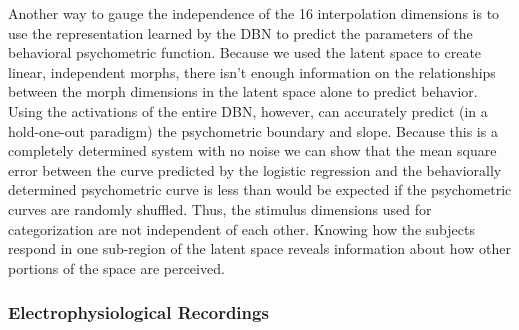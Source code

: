 Another way to gauge the independence of the 16 interpolation dimensions is to use the representation learned by the DBN to predict the parameters of the behavioral psychometric function. Because we used the latent space to create linear, independent morphs, there isn't enough information on the relationships between the morph dimensions in the latent space alone to predict behavior. Using the activations of the entire DBN, however, can accurately predict (in a hold-one-out paradigm) the psychometric boundary and slope. Because this is a completely determined system with no noise we can show that the mean square error between the curve predicted by the logistic regression and the behaviorally determined psychometric curve is less than would be expected if the psychometric curves are randomly shuffled. Thus, the stimulus dimensions used for categorization are not independent of each other.  Knowing how the subjects respond in one sub-region of the latent space reveals information about how other portions of the space are perceived.

\subsubsection*{Electrophysiological Recordings}


